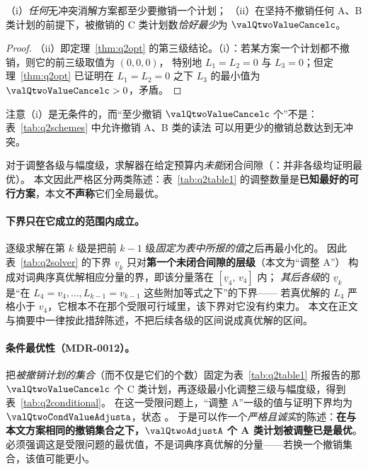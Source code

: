 \begin{corollary}[零撤销不可行]\label{cor:nozero}
（i）\emph{任何}无冲突消解方案都至少要撤销一个计划；
（ii）在坚持不撤销任何 A、B 类计划的前提下，被撤销的 C 类计划数\emph{恰好最少}为 $\valQtwoValueCancelc$。
\end{corollary}
\begin{proof}
（ii）即定理~\ref{thm:q2opt} 的第三级结论。（i）：若某方案一个计划都不撤销，则它的前三级取值为 $(0,0,0)$，
特别地 $L_1=L_2=0$ 与 $L_3=0$；但定理~\ref{thm:q2opt} 已证明在 $L_1=L_2=0$ 之下 $L_3$ 的最小值为
$\valQtwoValueCancelc>0$，矛盾。
\end{proof}
注意（i）是无条件的，而“至少撤销 $\valQtwoValueCancelc$ 个”不是：表~\ref{tab:q2schemes} 中允许撤销 A、B 类的读法
可以用更少的撤销总数达到无冲突。

对于调整各级与幅度级，求解器在给定预算内\emph{未能}闭合间隙（\valQtwoAllOptimal{}：并非各级均证明最优）。
本文因此严格区分两类陈述：表~\ref{tab:q2table1} 的调整数量是\textbf{已知最好的可行方案}，本文\textbf{不声称}它们全局最优。

\paragraph{下界只在它成立的范围内成立。}逐级求解在第 $k$ 级是把前 $k-1$ 级\emph{固定为表中所报的值}之后再最小化的。
因此表~\ref{tab:q2solver} 的下界 $\underline{v}_k$ 只对\textbf{第一个未闭合间隙的层级}（本文为“调整 A”）
构成对词典序真优解相应分量的界，即该分量落在 $[\underline{v}_4,\,v_4]$ 内；
\emph{其后各级}的 $\underline{v}_k$ 是“在 $L_4=v_4,\dots,L_{k-1}=v_{k-1}$ 这些附加等式之下”的下界——
若真优解的 $L_4$ 严格小于 $v_4$，它根本不在那个受限可行域里，该下界对它没有约束力。
本文在正文与摘要中一律按此措辞陈述，不把后续各级的区间说成真优解的区间。

\paragraph{条件最优性（MDR-0012）。}把\emph{被撤销计划的集合}（而不仅是它们的个数）固定为表~\ref{tab:q2table1}
所报告的那 $\valQtwoValueCancelc$ 个 C 类计划，再逐级最小化调整三级与幅度级，得到表~\ref{tab:q2conditional}。
在这一受限问题上，“调整 A”一级的值与证明下界均为 $\valQtwoCondValueAdjusta$，状态 \textsf{\valQtwoCondStatusAdjusta}。
于是可以作一个\emph{严格且诚实}的陈述：\textbf{在与本文方案相同的撤销集合之下，$\valQtwoAdjustA$ 个 A 类计划被调整已是最优}。
必须强调这是受限问题的最优值，不是词典序真优解的分量——若换一个撤销集合，该值可能更小。

